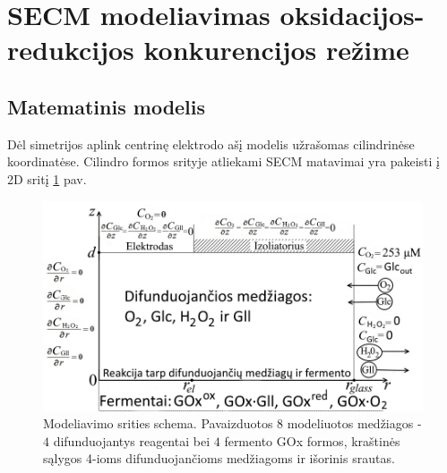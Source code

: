 
\pagestyle{plain}
\clearpage %


\section{SECM modeliavimas oksidacijos-redukcijos konkurencijos režime}
\label{sec:santr_reakc}



\subsection{Matematinis modelis}

Dėl simetrijos aplink centrinę elektrodo ašį modelis užrašomas cilindrinėse koordinatėse. Cilindro formos srityje atliekami SECM matavimai yra pakeisti į 2D sritį \ref{fig:santr_Domain} pav.


\begin{figure}[ht!]
\centering
\includegraphics[width=0.8\linewidth]{summary/Model_domainLT.png}
\caption{Modeliavimo srities schema. Pavaizduotos $8$ modeliuotos medžiagos - $4$ difunduojantys reagentai bei $4$ fermento GOx formos, kraštinės sąlygos 4-ioms difunduojančioms medžiagoms ir išorinis srautas.}
\label{fig:santr_Domain}
\end{figure}

